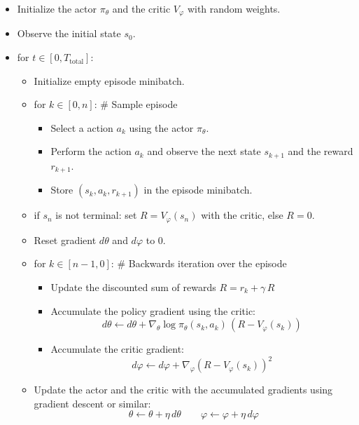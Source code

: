 \documentclass[
  letterpaper,
  DIV=11,
  numbers=noendperiod]{scrreprt}
\providecommand{\tightlist}{%
  \setlength{\itemsep}{0pt}\setlength{\parskip}{0pt}}\usepackage{longtable,booktabs,array}
\begin{document}
\begin{itemize}
\tightlist
\item
  Initialize the actor \(\pi_\theta\) and the critic \(V_\varphi\) with
  random weights.
\item
  Observe the initial state \(s_0\).
\item
  for \(t \in [0, T_\text{total}]\):

  \begin{itemize}
  \item
    Initialize empty episode minibatch.
  \item
    for \(k \in [0, n]\): \# Sample episode

    \begin{itemize}
    \tightlist
    \item
      Select a action \(a_k\) using the actor \(\pi_\theta\).
    \item
      Perform the action \(a_k\) and observe the next state \(s_{k+1}\)
      and the reward \(r_{k+1}\).
    \item
      Store \((s_k, a_k, r_{k+1})\) in the episode minibatch.
    \end{itemize}
  \item
    if \(s_n\) is not terminal: set \(R = V_\varphi(s_n)\) with the
    critic, else \(R=0\).
  \item
    Reset gradient \(d\theta\) and \(d\varphi\) to 0.
  \item
    for \(k \in [n-1, 0]\): \# Backwards iteration over the episode

    \begin{itemize}
    \tightlist
    \item
      Update the discounted sum of rewards \(R = r_k + \gamma \, R\)
    \item
      Accumulate the policy gradient using the critic: \[
        d\theta \leftarrow d\theta + \nabla_\theta \log \pi_\theta(s_k, a_k) \, (R - V_\varphi(s_k))
        \]
    \item
      Accumulate the critic gradient: \[
        d\varphi \leftarrow d\varphi + \nabla_\varphi (R - V_\varphi(s_k))^2
        \]
    \end{itemize}
  \item
    Update the actor and the critic with the accumulated gradients using
    gradient descent or similar: \[
      \theta \leftarrow \theta + \eta \, d\theta \qquad \varphi \leftarrow \varphi + \eta \, d\varphi
      \]
  \end{itemize}
\end{itemize}
\end{document}
